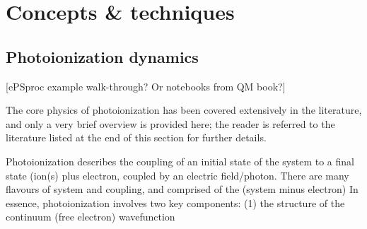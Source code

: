 \section{Concepts \& techniques}

\subsection{Photoionization dynamics} 
[ePSproc example walk-through? Or notebooks from QM book?]

The core physics of photoionization has been covered extensively in the literature, and only a very brief overview is provided here; the reader is referred to the literature listed at the end of this section for further details.

Photoionization describes the coupling of an initial state of the system to a final state (ion(s) plus electron, coupled by an electric field/photon. There are many flavours of system and coupling, and 
comprised of the (system minus electron)  In essence, photoionization involves two key components: (1) the structure of the continuum (free electron) wavefunction 